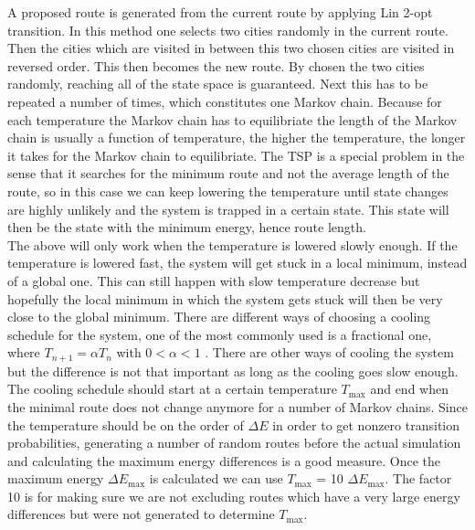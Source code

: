\documentclass[10pt,a4paper]{article}
\begin{document}
A proposed route is generated from the current route by applying Lin 2-opt transition. In this method one selects two cities randomly in the current route. Then the cities which are visited in between this two chosen cities are visited in reversed order. This then becomes the new route. By chosen the two cities randomly, reaching all of the state space is guaranteed. Next this has to be repeated a number of times, which constitutes one Markov chain. Because for each temperature the Markov chain has to equilibriate the length of the Markov chain is usually a function of temperature, the higher the temperature, the longer it takes for the Markov chain to equilibriate. The TSP is a special problem in the sense that it searches for the minimum route and not the average length of the route, so in this case we can keep lowering the temperature until state changes are highly unlikely and the system is trapped in a certain state. This state will then be the state with the minimum energy, hence route length.\\
The above will only work when the temperature is lowered slowly enough. If the temperature is lowered fast, the system will get stuck in a local minimum, instead of a global one. This can still happen with slow temperature decrease but hopefully the local minimum in which the system gets stuck will then be very close to the global minimum. There are different ways of choosing a cooling schedule for the system, one of the most commonly used is a fractional one, where $T_{n+1} = \alpha T_{n}$ with $ 0 < \alpha < 1$ \cite{book}. There are other ways of cooling the system but the difference is not that important as long as the cooling goes slow enough. The cooling schedule should start at a certain temperature $T_{\text{max}}$ and end when the minimal route does not change anymore for a number of Markov chains. Since the temperature should be on the order of $\Delta E$ in order to get nonzero transition probabilities, generating a number of random routes before the actual simulation and calculating the maximum energy differences is a good measure. Once the maximum energy $\Delta E_{\text{max}}$ is calculated we can use $T_{\text{max}}$ = 10 $\Delta E_{\text{max}}$. The factor 10 is for making sure we are not excluding routes which have a very large energy differences but were not generated to determine $T_{\text{max}}$.
\end{document}
